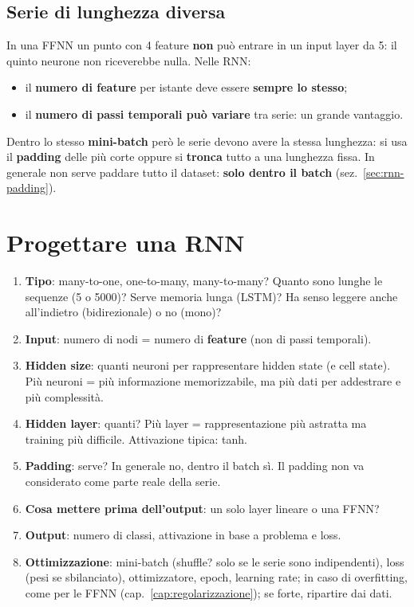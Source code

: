 \subsection{Serie di lunghezza diversa}
In una FFNN un punto con 4 feature \textbf{non} può entrare in un input layer da 5: il quinto neurone non riceverebbe nulla.
Nelle RNN:
\begin{itemize}
  \item il \textbf{numero di feature} per istante deve essere \textbf{sempre lo stesso};
  \item il \textbf{numero di passi temporali può variare} tra serie: un grande vantaggio.
\end{itemize}
Dentro lo stesso \textbf{mini-batch} però le serie devono avere la stessa lunghezza: si usa il \textbf{padding} delle più corte
oppure si \textbf{tronca} tutto a una lunghezza fissa. In generale non serve paddare tutto il dataset: \textbf{solo dentro il batch}
(sez.~\ref{sec:rnn-padding}).

\section{Progettare una RNN}
\begin{enumerate}
  \item \textbf{Tipo}: many-to-one, one-to-many, many-to-many? Quanto sono lunghe le sequenze (5 o 5000)? Serve memoria lunga (LSTM)?
        Ha senso leggere anche all'indietro (bidirezionale) o no (mono)?
  \item \textbf{Input}: numero di nodi = numero di \textbf{feature} (non di passi temporali).
  \item \textbf{Hidden size}: quanti neuroni per rappresentare hidden state (e cell state). Più neuroni = più informazione memorizzabile,
        ma più dati per addestrare e più complessità.
  \item \textbf{Hidden layer}: quanti? Più layer = rappresentazione più astratta ma training più difficile. Attivazione tipica: tanh.
  \item \textbf{Padding}: serve? In generale no, dentro il batch sì. Il padding non va considerato come parte reale della serie.
  \item \textbf{Cosa mettere prima dell'output}: un solo layer lineare o una FFNN?
  \item \textbf{Output}: numero di classi, attivazione in base a problema e loss.
  \item \textbf{Ottimizzazione}: mini-batch (shuffle? solo se le serie sono indipendenti), loss (pesi se sbilanciato), ottimizzatore,
        epoch, learning rate; in caso di overfitting, come per le FFNN (cap.~\ref{cap:regolarizzazione}); se forte, ripartire dai dati.
\end{enumerate}

